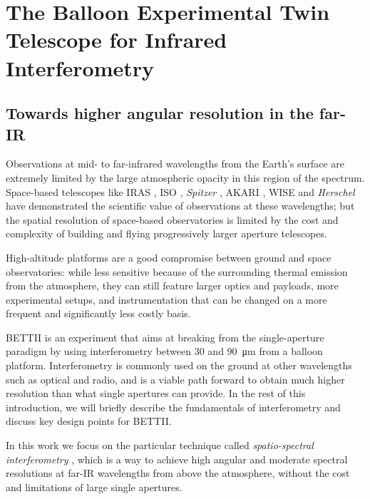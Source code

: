 \chapter{The Balloon Experimental Twin Telescope for Infrared Interferometry}
\label{chap:BETTII}

\section{Towards higher angular resolution in the far-IR}
Observations at mid- to far-infrared wavelengths from the Earth's surface are extremely 
limited by the large atmospheric opacity in this region of the spectrum. Space-based telescopes 
like IRAS \citep[12-100 \um;][]{1984ApJ...278L...1N}, ISO \citep[2.5-240 $\um$;][]{1996A&A...315L..27K}, \textit{Spitzer} \citep[3.6-160 $\um$;][]{2004ApJS..154....1W}, AKARI  \citep[1.7-180 $\um$;][]{2007PASJ...59S.369M}, WISE \citep[3.4-22 $\um$;][]{2010AJ....140.1868W} and \textit{Herschel} \citep[55-672 $\um$;][]{2010A&A...518L...1P} have demonstrated the scientific value of observations at 
these wavelengths; but the spatial resolution of space-based observatories is limited by the cost 
and complexity of building and flying progressively larger aperture telescopes. 

High-altitude platforms are a good compromise between ground and space observatories: while less sensitive because of the surrounding thermal emission from the atmosphere, they can still feature larger optics and payloads, more experimental setups, and instrumentation that can be changed on a more frequent and significantly less costly basis.

BETTII is an experiment that aims at breaking from the single-aperture paradigm by using interferometry between 30 and \SI{90}{\micro\meter} from a balloon platform. Interferometry is commonly used on the ground at other wavelengths such as optical and radio, and is a viable path forward to obtain much higher resolution than what single apertures can provide. In the rest of this introduction, we will briefly describe the fundamentals of interferometry and discuss key design points for BETTII. 

In this work we focus on the particular technique called \textit{spatio-spectral interferometry} \citep{Mariotti:1988vea}, which is a way to achieve 
high angular and moderate spectral resolutions at far-IR wavelengths from above the atmosphere, without the cost and limitations of large single apertures. 


%



